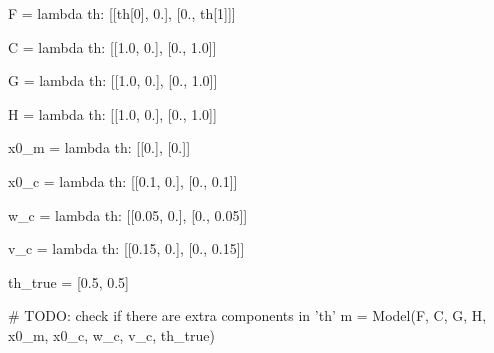 \documentclass[a4paper,14pt]{extarticle}
\begin{document}
\begin{pycode}[model1]
F = lambda th: [[th[0], 0.],
                [0., th[1]]]

C = lambda th: [[1.0, 0.],
                [0., 1.0]]

G = lambda th: [[1.0, 0.],
                [0., 1.0]]

H = lambda th: [[1.0, 0.],
                [0., 1.0]]

x0_m = lambda th: [[0.],
                   [0.]]

x0_c = lambda th: [[0.1, 0.],
                   [0., 0.1]]

w_c = lambda th: [[0.05, 0.],
                  [0., 0.05]]

v_c = lambda th: [[0.15, 0.],
                  [0., 0.15]]

th_true = [0.5, 0.5]

# TODO: check if there are extra components in 'th'
m = Model(F, C, G, H, x0_m, x0_c, w_c, v_c, th_true)
\end{pycode}

\end{document}
